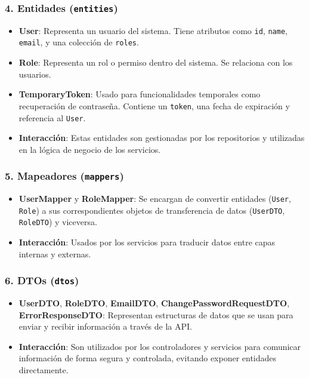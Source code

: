 \subsubsection*{4. Entidades (\texttt{entities})}

\begin{itemize}
  \item \textbf{User}: Representa un usuario del sistema. Tiene atributos como \texttt{id}, \texttt{name}, \texttt{email}, y una colección de \texttt{roles}.
  \item \textbf{Role}: Representa un rol o permiso dentro del sistema. Se relaciona con los usuarios.
  \item \textbf{TemporaryToken}: Usado para funcionalidades temporales como recuperación de contraseña. Contiene un \texttt{token}, una fecha de expiración y referencia al \texttt{User}.
  \item \textbf{Interacción}: Estas entidades son gestionadas por los repositorios y utilizadas en la lógica de negocio de los servicios.
\end{itemize}

\subsubsection*{5. Mapeadores (\texttt{mappers})}

\begin{itemize}
  \item \textbf{UserMapper} y \textbf{RoleMapper}: Se encargan de convertir entidades (\texttt{User}, \texttt{Role}) a sus correspondientes objetos de transferencia de datos (\texttt{UserDTO}, \texttt{RoleDTO}) y viceversa.
  \item \textbf{Interacción}: Usados por los servicios para traducir datos entre capas internas y externas.
\end{itemize}

\subsubsection*{6. DTOs (\texttt{dtos})}

\begin{itemize}
  \item \textbf{UserDTO}, \textbf{RoleDTO}, \textbf{EmailDTO}, \textbf{ChangePasswordRequestDTO}, \textbf{ErrorResponseDTO}: Representan estructuras de datos que se usan para enviar y recibir información a través de la API.
  \item \textbf{Interacción}: Son utilizados por los controladores y servicios para comunicar información de forma segura y controlada, evitando exponer entidades directamente.
\end{itemize}

